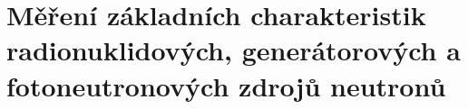 \section[Neutronové zdroje]{Měření základních charakteristik radionuklidových, generátorových a fotoneutronových zdrojů neutronů}

